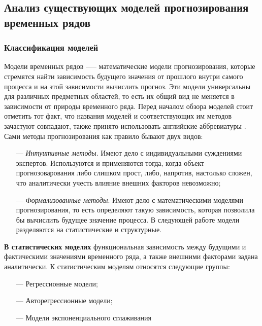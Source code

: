 \subsection{Анализ существующих моделей прогнозирования временных рядов}

\subsubsection{Классификация моделей}

\par Модели временных рядов —-- математические модели прогнозирования, которые стремятся найти зависимость будущего значения от прошлого внутри самого процесса и на этой зависимости вычислить прогноз. Эти модели универсальны для различных предметных областей, то есть их общий вид не меняется в зависимости от природы временного ряда. Перед началом обзора моделей стоит отметить тот факт, что названия моделей и соответствующих им методов зачастуют совпадают, также принято использовать английские аббревиатуры \cite{math-model}. Сами методы прогнозирования как правило бывают двух видов:
\begin{itemize}[leftmargin=1.6\parindent]
	\item[---] \textit{Интуитивные методы}. Имеют дело с индивидуальными суждениями экспертов. Используются и применяются тогда, когда объект прогнозоварования либо слишком прост, либо, напротив, настолько сложен, что аналитически учесть влияние внешних факторов невозможно;
	\item[---] \textit{Формализованные методы}. Имеют дело с математическими моделями прогнозирования, то есть определяют такую зависимость, которая позволила бы вычислить будущее значение процесса. В следующей работе \cite{math-model-1} модели разделяются на статистические и структурные.
\end{itemize}

\par \textbf{В статистических моделях} функциональная зависимость между будущими и фактическими значениями временного ряда, а также внешними факторами задана аналитически. К статистическим моделям относятся следующие группы:

\begin{itemize}[leftmargin=1.6\parindent]
	\item[---] Регрессионные модели;
	\item[---] Авторегрессионные модели;
	\item[---] Модели экспоненциального сглаживания
\end{itemize}

